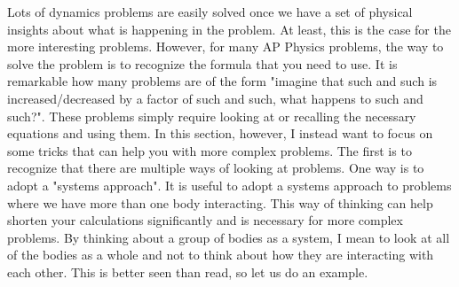 Lots of dynamics problems are easily solved once we have a set of physical insights about what is happening in the problem. At least, this is the case for the more interesting problems. However, for many AP Physics problems, the way to solve the problem is to recognize the formula that you need to use. It is remarkable how many problems are of the form "imagine that such and such is increased/decreased by a factor of such and such, what happens to such and such?". These problems simply require looking at or recalling the necessary equations and using them. In this section, however, I instead want to focus on some tricks that can help you with more complex problems. The first is to recognize that there are multiple ways of looking at problems. One way is to adopt a "systems approach". It is useful to adopt a systems approach to problems where we have more than one body interacting. This way of thinking can help shorten your calculations significantly and is necessary for more complex problems. By thinking about a group of bodies as a system, I mean to look at all of the bodies as a whole and not to think  about how they are interacting with each other. This is better seen than read, so let us do an example. 

